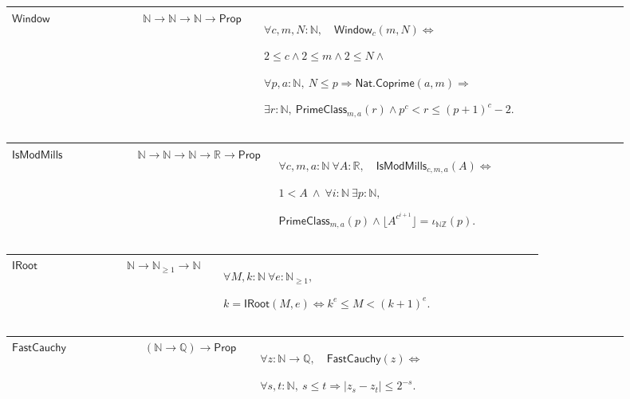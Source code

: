 \documentclass[12pt,reqno]{amsart}
\newcommand{\N}{\mathbb N}
\newcommand{\Z}{\mathbb Z}
\newcommand{\Q}{\mathbb Q}
\newcommand{\R}{\mathbb R}
\newcommand{\Np}{\N_{\ge1}}
\theoremstyle{blueplain}
\numberwithin{equation}{section}
\def\hyperlink#1#2{#2}}
\begin{document}
\par\setlength{\parskip}{0pt}\nointerlineskip
\noindent
\begin{tabular}{|@{}p{0.19251\linewidth}|p{0.16845\linewidth}|p{0.53904\linewidth}|}\hline
{\hypertarget{def:Window}{\(\textsf{Window}\)}} & {\(\N\to\N\to\N\to\textsf{Prop}\)} & {\(\displaystyle \forall c,m,N:\N,\quad \hyperlink{def:Window}{\ensuremath{\textsf{Window}}}_c(m,N)\Longleftrightarrow\)
\par
\(\displaystyle 2\le c\wedge2\le m\wedge2\le N\wedge\)
\par
\(\displaystyle \forall p,a:\N,\ N\le p\Rightarrow \hyperlink{def:Nat.Coprime}{\ensuremath{\textsf{Nat.Coprime}}}(a,m)\Rightarrow\)
\par
\(\displaystyle \exists r:\N,\ \hyperlink{def:PrimeClass}{\ensuremath{\textsf{PrimeClass}}}_{m,a}(r)\wedge p^c<r\le(p+1)^c-2.\)}\\
\hline
\end{tabular}%
\par\setlength{\parskip}{0pt}\nointerlineskip
\noindent
\begin{tabular}{|@{}p{0.19251\linewidth}|p{0.16845\linewidth}|p{0.53904\linewidth}|}\hline
{\hypertarget{def:IsModMills}{\(\textsf{IsModMills}\)}} & {\(\N\to\N\to\N\to\R\to\textsf{Prop}\)} & {\(\displaystyle \forall c,m,a:\N\ \forall A:\R,\quad \hyperlink{def:IsModMills}{\ensuremath{\textsf{IsModMills}}}_{c,m,a}(A)\Longleftrightarrow\)
\par
\(\displaystyle 1<A\ \wedge\ \forall i:\N\ \exists p:\N,\)
\par
\(\displaystyle \hyperlink{def:PrimeClass}{\ensuremath{\textsf{PrimeClass}}}_{m,a}(p)\wedge\lfloor A^{c^{i+1}}\rfloor=\iota_{\N\Z}(p).\)}\\
\hline
\end{tabular}%
\par\setlength{\parskip}{0pt}\nointerlineskip
\noindent
\begin{tabular}{|@{}p{0.19251\linewidth}|p{0.16845\linewidth}|p{0.53904\linewidth}|}\hline
{\hypertarget{def:IRoot}{\(\textsf{IRoot}\)}} & {\(\N\to\Np\to\N\)} & {\(\displaystyle \forall M,k:\N\ \forall e:\Np,\)
\par
\(\displaystyle k=\hyperlink{def:IRoot}{\ensuremath{\textsf{IRoot}}}(M,e)\Longleftrightarrow k^e\le M<(k+1)^e.\)}\\
\hline
\end{tabular}%
\par\setlength{\parskip}{0pt}\nointerlineskip
\noindent
\begin{tabular}{|@{}p{0.19251\linewidth}|p{0.16845\linewidth}|p{0.53904\linewidth}|}\hline
{\hypertarget{def:FastCauchy}{\(\textsf{FastCauchy}\)}} & {\((\N\to\Q)\to\textsf{Prop}\)} & {\(\displaystyle \forall z:\N\to\Q,\quad \hyperlink{def:FastCauchy}{\ensuremath{\textsf{FastCauchy}}}(z)\Longleftrightarrow\)
\par
\(\displaystyle \forall s,t:\N,\ s\le t\Rightarrow|z_s-z_t|\le2^{-s}.\)}\\
\hline
\end{tabular}%
\end{document}
